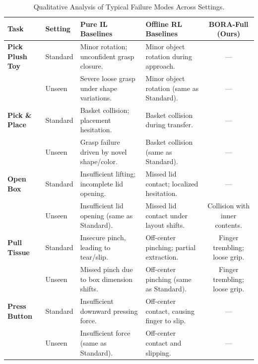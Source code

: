 \documentclass{article}
\begin{document}
\begin{table}[htbp]
\centering
\caption{Qualitative Analysis of Typical Failure Modes Across Settings.}
\label{tab:failure_modes}
\footnotesize %
\begin{tabularx}{\textwidth}{@{}l l X X c@{}}
\toprule
\textbf{Task} & \textbf{Setting} & \textbf{Pure IL Baselines} & \textbf{Offline RL Baselines} & \textbf{BORA-Full (Ours)} \\
\midrule
\textbf{Pick Plush Toy} 
& Standard & Minor rotation; unconfident grasp closure. & Minor object rotation during approach. & --- \\
& Unseen   & Severe loose grasp under shape variations. & Minor object rotation (same as Standard). & --- \\
\midrule
\textbf{Pick \& Place} 
& Standard & Basket collision; placement hesitation. & Basket collision during transfer. & --- \\
& Unseen   & Grasp failure driven by novel shape/color. & Basket collision (same as Standard). & --- \\
\midrule
\textbf{Open Box} 
& Standard & Insufficient lifting; incomplete lid opening. & Missed lid contact; localized hesitation. & --- \\
& Unseen   & Insufficient lid opening (same as Standard). & Missed lid contact under layout shifts. & Collision with inner contents. \\
\midrule
\textbf{Pull Tissue} 
& Standard & Insecure pinch, leading to tear/slip. & Off-center pinching; partial extraction. & Finger trembling; loose grip. \\
& Unseen   & Missed pinch due to box dimension shifts. & Off-center pinching (same as Standard). & Finger trembling; loose grip. \\
\midrule
\textbf{Press Button} 
& Standard & Insufficient downward pressing force. & Off-center contact, causing finger to slip. & --- \\
& Unseen   & Insufficient force (same as Standard). & Off-center contact and slipping. & --- \\
\bottomrule
\end{tabularx}
\end{table}

\end{document}
